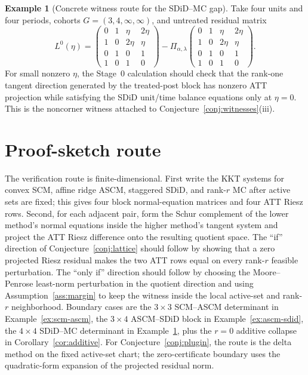 \documentclass[11pt]{article}
\theoremstyle{definition}
\newtheorem{example}{Example}
\theoremstyle{plain}
\theoremstyle{remark}
\begin{document}
\begin{example}[Concrete witness route for the SDiD--MC gap]\label{ex:witness}
Take four units and four periods, cohorts $G=(3,4,\infty,\infty)$, and
untreated residual matrix
\[
  L^0(\eta)=
  \begin{pmatrix}
  0&1&\eta&2\eta\\
  1&0&2\eta&\eta\\
  0&1&0&1\\
  1&0&1&0
  \end{pmatrix}
  - \Pi_{\alpha,\lambda}
  \begin{pmatrix}
  0&1&\eta&2\eta\\
  1&0&2\eta&\eta\\
  0&1&0&1\\
  1&0&1&0
  \end{pmatrix}.
\]
For small nonzero $\eta$, the Stage~0 calculation should check that the
rank-one tangent direction generated by the treated-post block has nonzero
ATT projection while satisfying the SDiD unit/time balance equations only at
$\eta=0$. This is the noncorner witness attached to
Conjecture~\ref{conj:witnesses}(iii).
\end{example}

\section{Proof-sketch route}
The verification route is finite-dimensional. First write the KKT systems for
convex SCM, affine ridge ASCM, staggered SDiD, and rank-$r$ MC after active
sets are fixed; this gives four block normal-equation matrices and four ATT
Riesz rows. Second, for each adjacent pair, form the Schur complement of the
lower method's normal equations inside the higher method's tangent system and
project the ATT Riesz difference onto the resulting quotient space. The
``if'' direction of Conjecture~\ref{conj:lattice} should follow by showing
that a zero projected Riesz residual makes the two ATT rows equal on every
rank-$r$ feasible perturbation. The ``only if'' direction should follow by
choosing the Moore--Penrose least-norm perturbation in the quotient direction
and using Assumption~\ref{ass:margin} to keep the witness inside the local
active-set and rank-$r$ neighborhood. Boundary cases are the $3\times3$
SCM--ASCM determinant in Example~\ref{ex:scm-ascm}, the $3\times4$
ASCM--SDiD block in Example~\ref{ex:ascm-sdid}, the $4\times4$ SDiD--MC
determinant in Example~\ref{ex:witness}, plus the $r=0$ additive collapse in
Corollary~\ref{cor:additive}. For Conjecture~\ref{conj:plugin}, the route is
the delta method on the fixed active-set chart; the zero-certificate boundary
uses the quadratic-form expansion of the projected residual norm.
\end{document}
